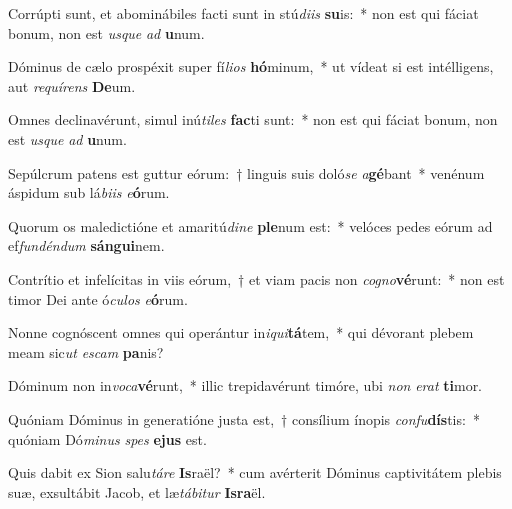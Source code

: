 \item Corrúpti sunt, et abominábiles facti sunt in stú\textit{di}\textit{is} \textbf{su}is:~* non est qui fáciat bonum, non est \textit{us}\textit{que} \textit{ad} \textbf{u}num.
\item Dóminus de cælo prospéxit super fí\textit{li}\textit{os} \textbf{hó}minum,~* ut vídeat si est intélligens, aut \textit{re}\textit{quí}\textit{rens} \textbf{De}um.
\item Omnes declinavérunt, simul inú\textit{ti}\textit{les} \textbf{fac}ti sunt:~* non est qui fáciat bonum, non est \textit{us}\textit{que} \textit{ad} \textbf{u}num.
\item Sepúlcrum patens est guttur eórum:~† linguis suis doló\textit{se} \textit{a}\textbf{gé}bant~* venénum áspidum sub lá\textit{bi}\textit{is} \textit{e}\textbf{ó}rum.
\item Quorum os maledictióne et amaritú\textit{di}\textit{ne} \textbf{ple}num est:~* velóces pedes eórum ad ef\textit{fun}\textit{dén}\textit{dum} \textbf{sán}\textbf{gui}nem.
\item Contrítio et infelícitas in viis eórum,~† et viam pacis non \textit{co}\textit{gno}\textbf{vé}runt:~* non est timor Dei ante ó\textit{cu}\textit{los} \textit{e}\textbf{ó}rum.
\item Nonne cognóscent omnes qui operántur in\textit{i}\textit{qui}\textbf{tá}tem,~* qui dévorant plebem meam sic\textit{ut} \textit{es}\textit{cam} \textbf{pa}nis?
\item Dóminum non in\textit{vo}\textit{ca}\textbf{vé}runt,~* illic trepidavérunt timóre, ubi \textit{non} \textit{e}\textit{rat} \textbf{ti}mor.
\item Quóniam Dóminus in generatióne justa est,~† consílium ínopis \textit{con}\textit{fu}\textbf{dís}tis:~* quóniam Dó\textit{mi}\textit{nus} \textit{spes} \textbf{e}\textbf{jus} est.
\item Quis dabit ex Sion salu\textit{tá}\textit{re} \textbf{Is}raël?~* cum avérterit Dóminus captivitátem plebis suæ, exsultábit Jacob, et læ\textit{tá}\textit{bi}\textit{tur} \textbf{Is}\textbf{ra}ël.
